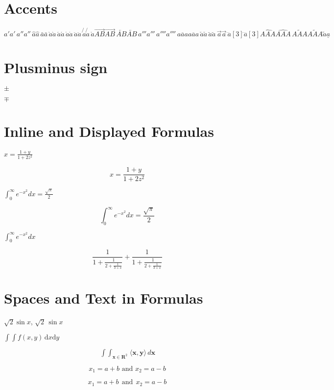 \documentclass{article}
\begin{document}
\section{Accents}

$a'	a'\,	a''	a''\,
\hat{a}	\hat{a} \,	\bar{a}	\bar{a} \,
\grave{a}	\grave{a} \,	\acute{a}	\acute{a} \,
\dot{a}	\dot{a} \,	\ddot{a}	\ddot{a} \,
\not{a}	\not{a} \,	\mathring{a}	
\overrightarrow{AB}	\overrightarrow{AB} \,	\overleftarrow{AB}	\overleftarrow{AB} \,
a'''	a'''\,	a''''	a''''\,
\overline{aaa}	\overline{aaa} \,	\check{a}	\check{a} \,
\breve{a}	\breve{a} \,	\vec{a}	\vec{a} \,
\dddot{a}[3]		\ddddot{a}[3]	
\widehat{AAA}	\widehat{AAA} \,	\widetilde{AAA}	\widetilde{AAA}
\tilde{a}	\underline{a}$

\section{Plusminus sign}

$\pm$

$\mp$

 

\section{Inline and Displayed Formulas}

$x=\frac{1+y}{1+2z^2}$

$$x=\frac{1+y}{1+2z^2}$$

$\int_0^\infty e^{-x^2} dx=\frac{\sqrt{\pi}}{2}$

$$\int_0^\infty e^{-x^2} dx=\frac{\sqrt{\pi}}{2}$$

$\displaystyle \int_0^\infty e^{-x^2} dx$

$$
 \frac{1}{\displaystyle 1+
   \frac{1}{\displaystyle 2+
   \frac{1}{\displaystyle 3+x}}} +
 \frac{1}{1+\frac{1}{2+\frac{1}{3+x}}}
$$

\section{Spaces and Text in Formulas}

$\sqrt{2} \sin x$, $\sqrt{2}\,\sin x$

$\int \!\! \int f(x,y)\,\mathrm{d}x\mathrm{d}y$

$$
 \mathop{\int \!\!\! \int}_{\mathbf{x} \in \mathbf{R}^2} 
 \! \langle \mathbf{x},\mathbf{y}\rangle 
 \,d\mathbf{x}
$$

$$ x_1 = a+b \mbox{ and } x_2=a-b $$

$$ x_1 = a+b ~~\mbox{and}~~ x_2=a-b $$
\end{document}
